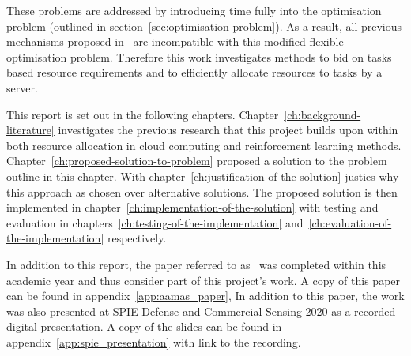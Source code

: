 These problems are addressed by introducing time fully into the optimisation problem (outlined in
section~\ref{sec:optimisation-problem}). As a result, all previous mechanisms proposed
in~\cite{FlexibleResourceAllocation} are incompatible with this modified flexible optimisation problem. Therefore this
work investigates methods to bid on tasks based resource requirements and to efficiently allocate resources to tasks by
a server.

This report is set out in the following chapters. Chapter~\ref{ch:background-literature} investigates the previous
research that this project builds upon within both resource allocation in cloud computing and reinforcement learning
methods. Chapter~\ref{ch:proposed-solution-to-problem} proposed a solution to the problem outline in this chapter.
With chapter~\ref{ch:justification-of-the-solution} justies why this approach as chosen over alternative solutions.
The proposed solution is then implemented in chapter~\ref{ch:implementation-of-the-solution} with testing and
evaluation in chapters~\ref{ch:testing-of-the-implementation} and~\ref{ch:evaluation-of-the-implementation} respectively.

In addition to this report, the paper referred to as~\cite{FlexibleResourceAllocation} was completed within this
academic year and thus consider part of this project's work. A copy of this paper can be found in
appendix~\ref{app:aamas_paper}, In addition to this paper, the work was also presented at SPIE Defense and Commercial
Sensing 2020 as a recorded digital presentation. A copy of the slides can be found in
appendix~\ref{app:spie_presentation} with link to the recording.

